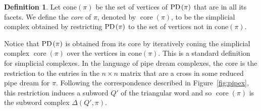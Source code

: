 \documentclass[10pt]{amsart}
\theoremstyle{definition}
\newtheorem{defi}[theo]{Definition}
\numberwithin{equation}{section}
\DeclareMathOperator{\core}{core}
\newcommand*\+{\smash{\lower2pt\hbox{\rlap{\vrule height14pt}}\raise2pt\hbox{\rlap{\hskip-3pt \vrule height.4pt depth0pt width14.7pt}}}}
\newcommand*{\MK}{\mkern 2mu}
\DeclareMathOperator{\PD}{\textit{PD}\MK}
\begin{document}
\begin{defi}\label{def:cone}
Let cone$(\pi)$ be the set of vertices of $\PD(\pi)$ that are in all its facets. We define the \emph{core} of $\pi$, denoted by $\core(\pi)$, to be the simplicial complex obtained by restricting $\PD(\pi)$ to the set of vertices not in cone$(\pi)$.
\end{defi}

Notice that $\PD(\pi)$ is obtained from its core by iteratively coning the simplicial complex $\core(\pi)$ over the vertices in cone$(\pi)$. This is a standard definition for simplicial complexes. In the language of pipe dream complexes, the core is the restriction to the entries in the $n\times n$ matrix that are a cross in some reduced pipe dream for $\pi$. Following the correspondence described in Figure~\ref{fig:pipex}, this restriction induces a subword $Q'$ of the triangular word and so $\core(\pi)$ is the subword complex $\Delta(Q',\pi)$.
\end{document}
